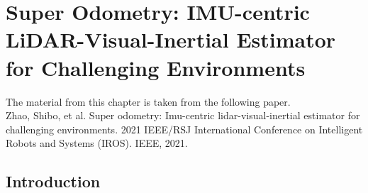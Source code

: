 
\chapter[Completed: Super Odometry: IMU-centric LiDAR-Visual-Inertial Estimator for
Challenging Environments]{Super Odometry: IMU-centric LiDAR-Visual-Inertial Estimator for
Challenging Environments}
\label{chapter:superodom}

\begin{framed} The material from this chapter is taken from the following paper. \\
Zhao, Shibo, et al. Super odometry: Imu-centric lidar-visual-inertial estimator for challenging environments. 2021 IEEE/RSJ International Conference on Intelligent Robots and Systems (IROS). IEEE, 2021.
\end{framed}

\section{Introduction}

